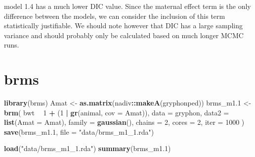 \documentclass[12pt,]{book}
\newenvironment{Shaded}{\begin{snugshade}}{\end{snugshade}}
\newcommand{\DataTypeTok}[1]{\textcolor[rgb]{0.13,0.29,0.53}{#1}}
\newcommand{\DecValTok}[1]{\textcolor[rgb]{0.00,0.00,0.81}{#1}}
\newcommand{\FloatTok}[1]{\textcolor[rgb]{0.00,0.00,0.81}{#1}}
\newcommand{\KeywordTok}[1]{\textcolor[rgb]{0.13,0.29,0.53}{\textbf{#1}}}
\newcommand{\NormalTok}[1]{#1}
\newcommand{\OperatorTok}[1]{\textcolor[rgb]{0.81,0.36,0.00}{\textbf{#1}}}
\newcommand{\StringTok}[1]{\textcolor[rgb]{0.31,0.60,0.02}{#1}}
\begin{document}
model 1.4 has a much lower DIC value. Since the maternal effect term is the only difference between the models, we can consider the inclusion of this term statistically justifiable. We should note however that DIC has a large sampling variance and should probably only be calculated based on much longer MCMC runs.

\hypertarget{brms-1}{%
\section{brms}\label{brms-1}}

\begin{Shaded}
\begin{Highlighting}[]
\KeywordTok{library}\NormalTok{(brms)}
\NormalTok{Amat <-}\StringTok{ }\KeywordTok{as.matrix}\NormalTok{(nadiv}\OperatorTok{::}\KeywordTok{makeA}\NormalTok{(gryphonped))}
\NormalTok{brms_m1}\FloatTok{.1}\NormalTok{ <-}\StringTok{ }\KeywordTok{brm}\NormalTok{(}
\NormalTok{  bwt }\OperatorTok{~}\StringTok{ }\DecValTok{1} \OperatorTok{+}\StringTok{ }\NormalTok{(}\DecValTok{1} \OperatorTok{|}\StringTok{ }\KeywordTok{gr}\NormalTok{(animal, }\DataTypeTok{cov =}\NormalTok{ Amat)),}
  \DataTypeTok{data =}\NormalTok{ gryphon,}
  \DataTypeTok{data2 =} \KeywordTok{list}\NormalTok{(}\DataTypeTok{Amat =}\NormalTok{ Amat),}
  \DataTypeTok{family =} \KeywordTok{gaussian}\NormalTok{(),}
  \DataTypeTok{chains =} \DecValTok{2}\NormalTok{, }\DataTypeTok{cores =} \DecValTok{2}\NormalTok{, }\DataTypeTok{iter =} \DecValTok{1000}
\NormalTok{)}
\KeywordTok{save}\NormalTok{(brms_m1}\FloatTok{.1}\NormalTok{, }\DataTypeTok{file =} \StringTok{"data/brms_m1_1.rda"}\NormalTok{)}
\end{Highlighting}
\end{Shaded}

\begin{Shaded}
\begin{Highlighting}[]
\KeywordTok{load}\NormalTok{(}\StringTok{"data/brms_m1_1.rda"}\NormalTok{)}
\KeywordTok{summary}\NormalTok{(brms_m1}\FloatTok{.1}\NormalTok{)}
\end{Highlighting}
\end{Shaded}
\end{document}
